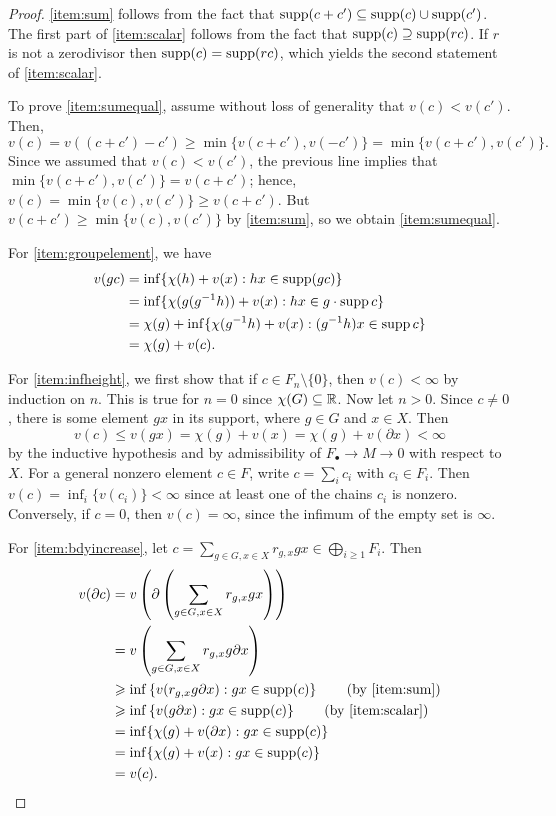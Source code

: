 \documentclass[11pt, letterpaper]{amsart}
\begin{document}
\begin{proof}
\ref{item:sum} follows from the fact that $\operatorname{supp}(c+c') \subseteq \operatorname{supp}(c) \cup \operatorname{supp}(c')$. The first part of \ref{item:scalar} follows from the fact that $\operatorname{supp}(c) \supseteq \operatorname{supp}(rc)$. If $r$ is not a zerodivisor then $\operatorname{supp}(c) = \operatorname{supp}(rc)$, which yields the second statement of \ref{item:scalar}.

To prove \ref{item:sumequal}, assume without loss of generality that $v(c) < v(c')$. Then,
\[
    v(c) = v((c+c') - c') \geqslant \min\{ v(c+c'), v(-c') \} = \min\{ v(c+c'), v(c') \}.
\]
Since we assumed that $v(c) < v(c')$, the previous line implies that $\min\{ v(c+c'), v(c') \} = v(c + c')$; hence, $v(c) = \min\{ v(c), v(c') \} \geqslant v(c + c')$. But $v(c + c') \geqslant \min\{v(c),v(c')\}$ by \ref{item:sum}, so we obtain \ref{item:sumequal}. 

For \ref{item:groupelement}, we have
\begin{align*}
    v(gc) &= \inf\{ \chi(h) + v(x) : hx \in \operatorname{supp}(gc) \} \\
    &= \inf\{ \chi(g (g^{-1} h)) + v(x) : hx \in g \cdot \operatorname{supp} c \} \\
    &= \chi(g) + \inf\{ \chi(g^{-1} h) + v(x) : (g^{-1} h)x \in \operatorname{supp} c \} \\
    &= \chi(g) + v(c).
\end{align*}

For \ref{item:infheight}, we first show that if $c \in F_n \setminus \{0 \}$, then $v(c) < \infty$ by induction on $n$. This is true for $n = 0$ since $\chi(G) \subseteq \mathbb{R}$. Now let $n > 0$. Since $c \neq 0$, there is some element $gx$ in its support, where $g \in G$ and $x \in X$. Then
\[
    v(c) \leqslant v(gx) = \chi(g) + v(x) = \chi(g) + v(\partial x) < \infty
\]
by the inductive hypothesis and by admissibility of $F_\bullet \longrightarrow M \longrightarrow 0$ with respect to $X$. For a general nonzero element $c \in F$, write $c = \sum_i c_i$ with $c_i \in F_i$. Then $v(c) = \inf_i\{ v(c_i) \} < \infty$ since at least one of the chains $c_i$ is nonzero. Conversely, if $c = 0$, then $v(c) = \infty$, since the infimum of the empty set is $\infty$.

For \ref{item:bdyincrease}, let $c = \sum_{g \in G, x \in X} r_{g,x} gx \in \bigoplus_{i \geqslant 1} F_i$. Then
\begin{align*}
    v(\partial c) &= v\left(\partial\left(\sum_{g \in G, x \in X} r_{g,x} gx\right)\right) \\
    &= v\left( \sum_{g \in G, x \in X} r_{g,x} g \partial x \right) \\
    &\geqslant \inf\left\{ v(r_{g,x} g\partial x) : gx \in \supp(c) \right\} \tag{by \ref{item:sum}} \\
    &\geqslant \inf\left\{ v( g\partial x) : gx \in \supp(c) \right\}  \tag{by \ref{item:scalar}} \\
    &= \inf\{ \chi(g) + v(\partial x) : gx \in \supp(c) \} \\
    &= \inf\{ \chi(g) + v(x) : gx \in \supp(c) \} \\
    &= v(c). \qedhere
\end{align*}
\end{proof}
\end{document}
